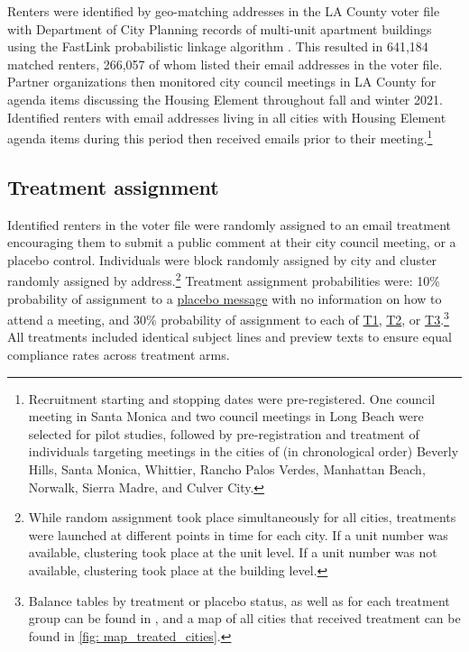 \documentclass[12pt,final,fleqn]{article}
\theoremstyle{plain}
\begin{document}
Renters were identified by geo-matching addresses in the LA County voter file with Department of City Planning records of multi-unit apartment buildings using the FastLink probabilistic linkage algorithm \citep{enamorado2019using}. This resulted in 641,184 matched renters, 266,057 of whom listed their email addresses in the voter file. Partner organizations then monitored city council meetings in LA County for agenda items discussing the Housing Element throughout fall and winter 2021. Identified renters with email addresses living in all cities with Housing Element agenda items during this period then received emails prior to their meeting.\footnote{Recruitment starting and stopping dates were pre-registered. One council meeting in Santa Monica and two council meetings in Long Beach were selected for pilot studies, followed by pre-registration and treatment of individuals targeting  meetings in the cities of (in chronological order) Beverly Hills, Santa Monica, Whittier, Rancho Palos Verdes, Manhattan Beach, Norwalk, Sierra Madre, and Culver City.} 
 
 
\subsection{Treatment assignment}

Identified renters in the voter file were randomly assigned to an email treatment encouraging them to submit a public comment at their city council meeting, or a placebo control. Individuals were block randomly assigned by city and cluster randomly assigned by address.\footnote{While random assignment took place simultaneously for all cities, treatments were launched at different points in time for each city. If a unit number was available, clustering took place at the unit level. If a unit number was not available, clustering took place at the building level.} Treatment assignment probabilities were: 10\% probability of assignment to a \hyperref[subfig: placebo]{placebo message} with no information on how to attend a meeting, and 30\% probability of assignment to each of \hyperref[subfig: T1]{T1}, \hyperref[subfig: T2]{T2}, or \hyperref[subfig: T1]{T3}.\footnote{Balance tables by treatment or placebo status, as well as for each treatment group can be found in , and a map of all cities that received treatment can be found in \autoref{fig: map_treated_cities}.} All treatments included identical subject lines and preview texts to ensure equal compliance rates across treatment arms. 
\end{document}
